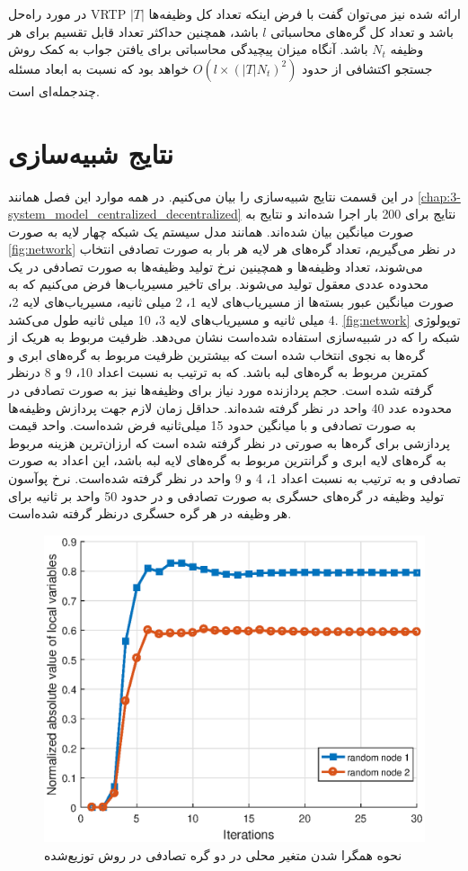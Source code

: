 	در مورد راه‌حل VRTP ارائه شده نیز می‌توان گفت با فرض اینکه تعداد کل وظیفه‌ها $|T|$ باشد و تعداد کل گره‌های محاسباتی $l$ باشد، همچنین حداکثر تعداد قابل تقسیم برای هر وظیفه $N_t$ باشد. آنگاه میزان پیچیدگی محاسباتی برای یافتن جواب به کمک روش جستجو اکتشافی از حدود $O(l\times(|T|N_t)^2)$ خواهد بود که نسبت به ابعاد مسئله چندجمله‌ای است. 
	
\section{نتایج شبیه‌سازی}
	در این قسمت نتایج شبیه‌سازی را بیان می‌کنیم. در همه موارد این فصل همانند \cref{chap:3-system_model_centralized_decentralized} نتایج برای 200 بار اجرا شده‌اند و نتایج به صورت میانگین بیان شده‌اند. همانند مدل سیستم یک شبکه چهار لایه به صورت \cref{fig:network} در نظر می‌گیریم، تعداد گره‌های هر لایه هر بار به صورت تصادفی انتخاب می‌شوند، تعداد وظیفه‌ها و همچینین نرخ تولید وظیفه‌ها به صورت تصادفی در یک محدوده عددی معقول تولید می‌شوند. 
	برای تاخیر مسیریاب‌ها فرض می‌کنیم که به صورت میانگین عبور بسته‌ها از مسیریاب‌های لایه 1، 2 میلی ثانیه، مسیریاب‌های لایه 2، 4 میلی ثانیه و مسیریاب‌های لایه 3، 10 میلی ثانیه طول می‌کشد.
\cref{fig:network} توپولوژی شبکه را که در شبیه‌سازی استفاده شده‌است نشان می‌دهد.
	ظرفیت مربوط به هریک از گره‌ها به نجوی انتخاب شده است که بیشترین ظرفیت مربوط به گره‌های ابری و کمترین مربوط به گره‌های لبه باشد. که به ترتیب به نسبت اعداد 10، 9 و 8 درنظر گرفته شده است. حجم پردازنده مورد نیاز برای وظیفه‌ها نیز به صورت تصادفی در محدوده عدد 40 واحد در نظر گرفته شده‌اند. حداقل زمان لازم جهت پردازش وظیفه‌ها به صورت تصادفی و با میانگین حدود 15 میلی‌ثانیه فرض شده‌است. واحد قیمت پردازشی برای گره‌ها به صورتی در نظر گرفته شده است که ارزان‌ترین هزینه مربوط به گره‌های لایه ابری و گرانترین مربوط به گره‌‌های لایه لبه باشد، این اعداد به صورت تصادفی و به ترتیب به نسبت اعداد 1، 4 و 9 واحد در نظر گرفته شده‌است. نرخ پوآسون تولید وظیفه در گره‌های حسگری به صورت تصادفی و در حدود 50 واحد بر ثانیه برای هر وظیفه در هر گره حسگری درنظر گرفته شده‌است. 


\begin{figure}[h!]
	\centerline{\includegraphics[width=12cm]{graphics/4-heuristic-dist/distributed_local_vars_convergence}}
	\caption{نحوه‌ همگرا شدن متغیر محلی در دو گره تصادفی در روش توزیع‌شده}
	\label{fig:distributed_local_vars_convergence}
\end{figure}

